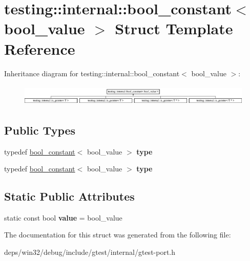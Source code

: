 \hypertarget{structtesting_1_1internal_1_1bool__constant}{}\section{testing\+:\+:internal\+:\+:bool\+\_\+constant$<$ bool\+\_\+value $>$ Struct Template Reference}
\label{structtesting_1_1internal_1_1bool__constant}
Inheritance diagram for testing\+:\+:internal\+:\+:bool\+\_\+constant$<$ bool\+\_\+value $>$\+:\begin{figure}[H]
\begin{center}
\leavevmode
\includegraphics[height=1.021898cm]{structtesting_1_1internal_1_1bool__constant}
\end{center}
\end{figure}
\subsection*{Public Types}
\begin{DoxyCompactItemize}
\item 
\hypertarget{structtesting_1_1internal_1_1bool__constant_aba6d09ecf7eecea6c93480f0d627a167}{}typedef \hyperlink{structtesting_1_1internal_1_1bool__constant}{bool\+\_\+constant}$<$ bool\+\_\+value $>$ {\bfseries type}\label{structtesting_1_1internal_1_1bool__constant_aba6d09ecf7eecea6c93480f0d627a167}

\item 
\hypertarget{structtesting_1_1internal_1_1bool__constant_aba6d09ecf7eecea6c93480f0d627a167}{}typedef \hyperlink{structtesting_1_1internal_1_1bool__constant}{bool\+\_\+constant}$<$ bool\+\_\+value $>$ {\bfseries type}\label{structtesting_1_1internal_1_1bool__constant_aba6d09ecf7eecea6c93480f0d627a167}

\end{DoxyCompactItemize}
\subsection*{Static Public Attributes}
\begin{DoxyCompactItemize}
\item 
\hypertarget{structtesting_1_1internal_1_1bool__constant_a499fba6576296b04d99690a486424b32}{}static const bool {\bfseries value} = bool\+\_\+value\label{structtesting_1_1internal_1_1bool__constant_a499fba6576296b04d99690a486424b32}

\end{DoxyCompactItemize}


The documentation for this struct was generated from the following file\+:\begin{DoxyCompactItemize}
\item 
deps/win32/debug/include/gtest/internal/gtest-\/port.\+h\end{DoxyCompactItemize}
